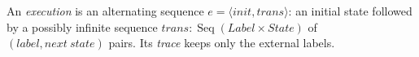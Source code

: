 \begin{definition}[Execution]
  \label{def:exec}
  \leanok
  An \emph{execution} is an alternating sequence $e = \langle init, trans\rangle$:
  an initial state followed by a possibly infinite sequence
  $trans : \operatorname{Seq}(Label \times State)$ of $(label, next\ state)$ pairs.
  Its \emph{trace} keeps only the external labels.
\end{definition}
